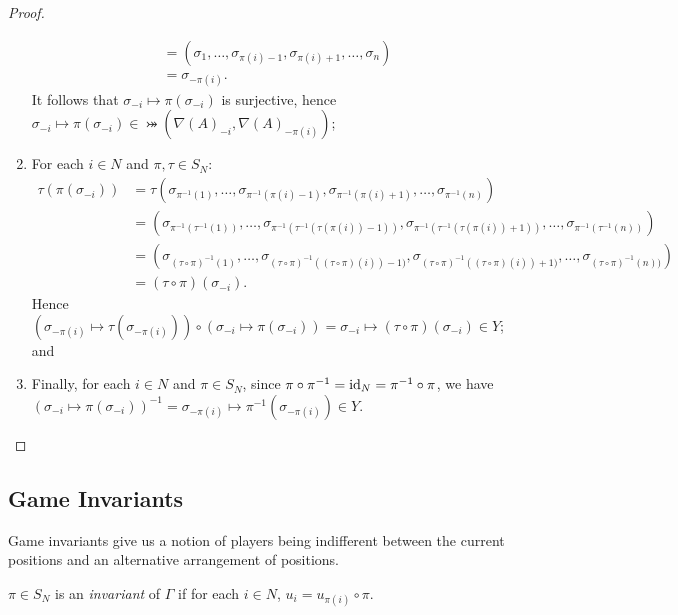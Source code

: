 \begin{proposition}
\begin{proof}
\begin{enumerate}
\begin{align*}
				&= (\sigma_1, \ldots, \sigma_{\pi(i)-1}, \sigma_{\pi(i)+1}, \ldots, \sigma_n)\\
				&= \sigma_{-\pi(i)}.
			\end{align*}
			It follows that $\sigma_{-i} \mapsto \pi(\sigma_{-i})$ is surjective, hence $\sigma_{-i} \mapsto \pi(\sigma_{-i}) \in \bij({\nabla(A)}_{-i}, {\nabla(A)}_{-\pi(i)})$;
			\item For each $i \in N$ and $\pi, \tau \in S_N$:
			\begin{align*}
				\tau(\pi(\sigma_{-i})) &= \tau(\sigma_{\pi^{-1}(1)}, \ldots, \sigma_{\pi^{-1}\left(\pi(i)-1\right)}, \sigma_{\pi^{-1}\left(\pi(i)+1\right)}, \ldots, \sigma_{\pi^{-1}(n)}) \\
				&= (\sigma_{\pi^{-1}(\tau^{-1}(1))}, \ldots, \sigma_{\pi^{-1}\left(\tau^{-1}(\tau(\pi(i))-1)\right)}, \sigma_{\pi^{-1}\left(\tau^{-1}(\tau(\pi(i))+1)\right)}, \ldots, \sigma_{\pi^{-1}(\tau^{-1}(n))}) \\
				&= (\sigma_{(\tau \circ \pi)^{-1}(1)}, \ldots, \sigma_{(\tau \circ \pi)^{-1}((\tau \circ \pi)(i))-1)}, \sigma_{(\tau \circ \pi)^{-1}((\tau \circ \pi)(i))+1)}, \ldots, \sigma_{(\tau \circ \pi)^{-1}(n))}) \\
				&= (\tau \circ \pi)(\sigma_{-i}).
			\end{align*}
			Hence $(\sigma_{-\pi(i)} \mapsto \tau(\sigma_{-\pi(i)})) \circ (\sigma_{-i} \mapsto \pi(\sigma_{-i})) = \sigma_{-i} \mapsto (\tau \circ \pi)(\sigma_{-i}) \in Y$; and
			\item Finally, for each $i \in N$ and $\pi \in S_N$, since $\pi \circ \pi^{-1} = \text{id}_N = \pi^{-1} \circ \pi$, we have $(\sigma_{-i} \mapsto \pi(\sigma_{-i}))^{-1} = \sigma_{-\pi(i)} \mapsto \pi^{-1}(\sigma_{-\pi(i)}) \in Y$.
		\end{enumerate} \vspace{-0.8cm}
	\end{proof}
\end{proposition}

\subsection{Game Invariants}
Game invariants give us a notion of players being indifferent between the current positions and an alternative arrangement of positions.

\begin{definition}
	$\pi \in S_N$ is an \textit{invariant} of $\Gamma$ if for each $i \in N$, $u_i = u_{\pi(i)} \circ \pi$.
\end{definition}

